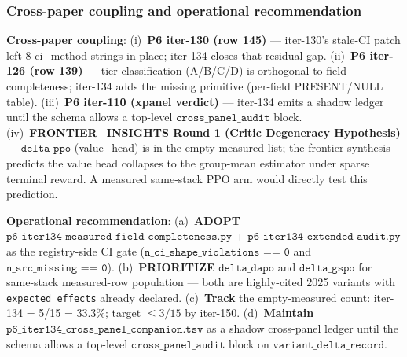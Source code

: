 \subsubsection{Cross-paper coupling and operational recommendation}
\label{sec:p6-iter134-coupling}

\textbf{Cross-paper coupling}:
(i)~\textbf{P6 iter-130 (row 145)} --- iter-130's stale-CI patch left 8
ci\_method strings in place; iter-134 closes that residual gap.
(ii)~\textbf{P6 iter-126 (row 139)} --- tier classification (A/B/C/D) is
orthogonal to field completeness; iter-134 adds the missing primitive
(per-field PRESENT/NULL table).
(iii)~\textbf{P6 iter-110 (xpanel verdict)} --- iter-134 emits a shadow
ledger until the schema allows a top-level $\texttt{cross\_panel\_audit}$
block.
(iv)~\textbf{FRONTIER\_INSIGHTS Round 1 (Critic Degeneracy Hypothesis)} ---
$\texttt{delta\_ppo}$ (value\_head) is in the empty-measured list; the
frontier synthesis predicts the value head collapses to the group-mean
estimator under sparse terminal reward. A measured same-stack PPO arm
would directly test this prediction.

\textbf{Operational recommendation}:
(a)~\textbf{ADOPT} $\texttt{p6\_iter134\_measured\_field\_completeness.py}$
+ $\texttt{p6\_iter134\_extended\_audit.py}$ as the registry-side CI gate
($\texttt{n\_ci\_shape\_violations == 0}$ and
$\texttt{n\_src\_missing == 0}$).
(b)~\textbf{PRIORITIZE} $\texttt{delta\_dapo}$ and $\texttt{delta\_gspo}$
for same-stack measured-row population --- both are highly-cited 2025
variants with \texttt{expected\_effects} already declared.
(c)~\textbf{Track} the empty-measured count: iter-134 = 5/15 = 33.3\%;
target $\leq 3/15$ by iter-150.
(d)~\textbf{Maintain} $\texttt{p6\_iter134\_cross\_panel\_companion.tsv}$
as a shadow cross-panel ledger until the schema allows a top-level
$\texttt{cross\_panel\_audit}$ block on $\texttt{variant\_delta\_record}$.